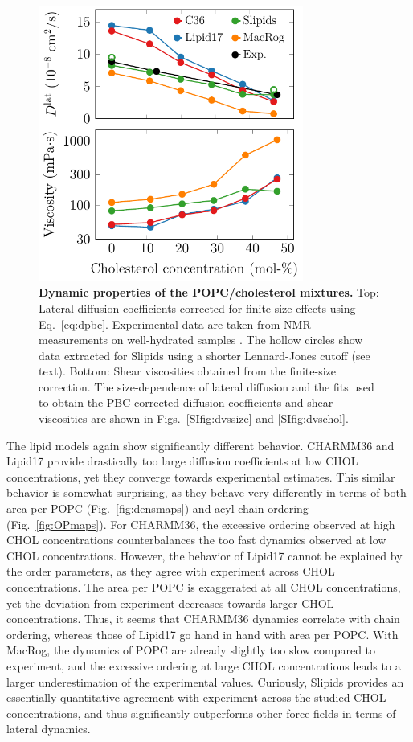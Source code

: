 \documentclass[aps,prl,superscriptaddress]{revtex4-2}
\begin{document}
\begin{figure}[htb!]
  \centering
  \includegraphics[width=8.7cm]{../FIGS/dynamics.pdf}
  \caption{\label{fig:dynamics}%
  \textbf{Dynamic properties of the POPC/cholesterol mixtures.}
  Top: Lateral diffusion coefficients corrected for finite-size effects using Eq.~\eqref{eq:dpbc}. Experimental data are taken from NMR measurements on well-hydrated samples \cite{filippov2003influence,filippov2003effect}. The hollow circles show data extracted for Slipids using a shorter Lennard-Jones cutoff (see text).
  Bottom: Shear viscosities obtained from the finite-size correction.
  The size-dependence of lateral diffusion and the fits used to obtain the PBC-corrected diffusion coefficients and shear viscosities are shown in Figs.~\ref{SIfig:dvssize} and \ref{SIfig:dvschol}.
  }
\end{figure}

The lipid models again show significantly different behavior. CHARMM36 and Lipid17 provide drastically too large diffusion coefficients at low CHOL concentrations, yet they converge towards experimental estimates. This similar behavior is somewhat surprising, as they behave very differently in terms of both area per POPC (Fig.~\ref{fig:densmaps}) and acyl chain ordering (Fig.~\ref{fig:OPmaps}). For CHARMM36, the excessive ordering observed at high CHOL concentrations counterbalances the too fast dynamics observed at low CHOL concentrations. However, the behavior of Lipid17 cannot be explained by the order parameters, as they agree with experiment across CHOL concentrations. The area per POPC is exaggerated at all CHOL concentrations, yet the deviation from experiment decreases towards larger CHOL concentrations. Thus, it seems that CHARMM36 dynamics correlate with chain ordering, whereas those of Lipid17 go hand in hand with area per POPC. With MacRog, the dynamics of POPC are already slightly too slow compared to experiment, and the excessive ordering at large CHOL concentrations leads to a larger underestimation of the experimental values. Curiously, Slipids provides an essentially quantitative agreement with experiment across the studied CHOL concentrations, and thus significantly outperforms other force fields in terms of lateral dynamics. 
\end{document}
